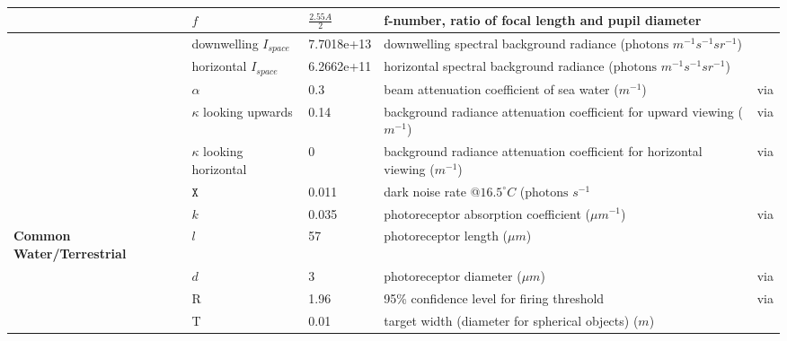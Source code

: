 \begin{tabular}{|L{3.5cm}|L{2.5cm}|L{2.5cm}|L{4.5cm}|L{4.5cm}|}
 &$f$&$\frac{2.55A}{2}$&f-number, ratio of focal length and pupil diameter&\cite{Nils14a}\\\hline
 &downwelling $I_{space}$&7.7018e+13&downwelling spectral background radiance ($\text{photons } m^{-1} s^{-1} sr^{-1}$)&\cite{Nils14a}\\\hline
 &horizontal $I_{space}$&6.2662e+11&horizontal spectral background radiance ($\text{photons } m^{-1} s^{-1} sr^{-1}$)&\cite{Nils14a}\\\hline
 &$\alpha$&0.3&beam attenuation coefficient of sea water ($m^{-1}$)&\cite{Nils14a} via \cite{John02a}\\\hline
 &$\kappa$ looking upwards&0.14&background radiance attenuation coefficient for upward viewing ($m^{-1}$)&\cite{Nils14a} via \cite{John02a}\\\hline
 &$\kappa$ looking horizontal&0&background radiance attenuation coefficient for horizontal viewing ($m^{-1}$)&\cite{Nils14a} via \cite{John02a}\\\hline
 &$\mathtt{X}$&0.011&dark noise rate @$16.5^{\circ} C$ ($\text{photons } s^{-1}$&\cite{Aho93a}\\\hline
 &$k$&0.035&photoreceptor absorption coefficient ($\mu m^{-1}$)&\cite{Warr98a} via \cite{Part90a}\\\hline
\textbf{Common Water/Terrestrial}&$l$&57&photoreceptor length ($\mu m$)&\cite{Nils14a}\\\hline
 &$d$&3&photoreceptor diameter ($\mu m$)&\cite{Nils14a} via \cite{Land12a}\\\hline
 &R&1.96&95\% confidence level for firing threshold&\cite{Nils14a} via \cite{Land81a}\\\hline
 &T&0.01&target width (diameter for spherical objects) ($m$)& \\\hline
\end{tabular}
